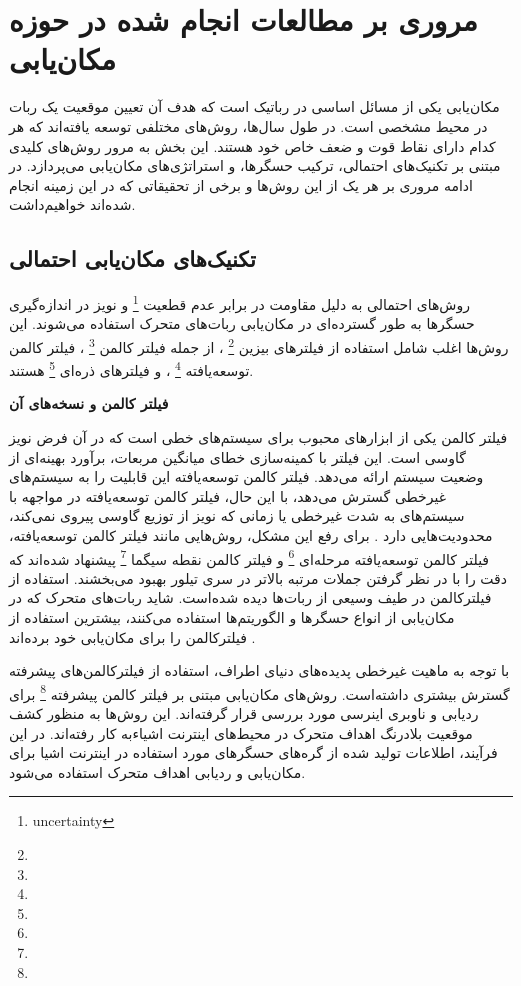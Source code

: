 \section{مروری بر مطالعات انجام شده در حوزه مکان‌یابی} 

مکان‌یابی یکی از مسائل اساسی در رباتیک است که هدف آن تعیین موقعیت یک ربات در محیط مشخصی است. در طول سال‌ها، روش‌های مختلفی توسعه یافته‌اند که هر کدام دارای نقاط قوت و ضعف خاص خود هستند. این بخش به مرور روش‌های کلیدی مبتنی بر تکنیک‌های احتمالی، ترکیب حسگرها، و استراتژی‌های مکان‌یابی می‌پردازد. در ادامه مروری بر هر یک از این روش‌ها و برخی از تحقیقاتی که در این زمینه انجام شده‌اند خواهیم‌داشت.


\subsection{تکنیک‌های مکان‌یابی احتمالی}

روش‌های احتمالی به دلیل مقاومت در برابر عدم قطعیت
\footnote{uncertainty}
 و نویز در اندازه‌گیری حسگرها به طور گسترده‌ای در مکان‌یابی ربات‌های متحرک استفاده می‌شوند. این روش‌ها اغلب شامل استفاده از فیلترهای بیزین
\footnote{}
 ، از جمله فیلتر کالمن
\footnote{}
، فیلتر کالمن توسعه‌یافته
\footnote{}
، و فیلترهای ذره‌ای
\footnote{}
 هستند.


\textbf {فیلتر کالمن و نسخه‌های آن}

فیلتر کالمن یکی از ابزارهای محبوب برای سیستم‌های خطی است که در آن فرض نویز گاوسی است. این فیلتر با کمینه‌سازی خطای میانگین مربعات، برآورد بهینه‌ای از وضعیت سیستم ارائه می‌دهد. فیلتر کالمن توسعه‌یافته این قابلیت را به سیستم‌های غیرخطی گسترش می‌دهد، با این حال،  فیلتر کالمن توسعه‌یافته در مواجهه با سیستم‌های به شدت غیرخطی یا زمانی که نویز از توزیع گاوسی پیروی نمی‌کند، محدودیت‌هایی دارد
\cite{burgard1997active}
. برای رفع این مشکل، روش‌هایی مانند فیلتر کالمن توسعه‌یافته، فیلتر کالمن توسعه‌یافته مرحله‌ای
\footnote{}
 و فیلتر کالمن نقطه سیگما
 \footnote{}
  پیشنهاد شده‌اند که دقت را با در نظر گرفتن جملات مرتبه بالاتر در سری تیلور بهبود می‌بخشند.
استفاده از فیلترکالمن در طیف وسیعی از ربات‌ها دیده‌ شده‌است. شاید ربات‌های متحرک که در مکان‌یابی از انواع حسگر‌ها و الگوریتم‌ها استفاده می‌کنند، بیشترین‌ استفاد‌ه از فیلترکالمن را برای مکان‌یابی خود برده‌اند
\cite{liu2021cost, lin2018topological, negenborn2003robot}. 

با توجه به ماهیت غیرخطی پدیده‌های دنیای اطراف، استفاده از فیلترکالمن‌های پیشرفته گسترش بیشتری داشته‌است. 
\cite{zhan2007iterated, guo2014square, xian2016square, filtermobile} 
 روش‌های مکان‌یابی مبتنی بر فیلتر کالمن پیشرفته
\footnote{}
  برای ردیابی و ناوبری اینرسی مورد بررسی قرار گرفته‌اند. این روش‌ها به منظور کشف موقعیت بلادرنگ اهداف متحرک در محیط‌های اینترنت اشیاءبه کار رفته‌اند. در این فرآیند، اطلاعات تولید شده از گره‌های حسگرهای مورد استفاده در اینترنت اشیا برای مکان‌یابی و ردیابی اهداف متحرک استفاده می‌شود.
  
